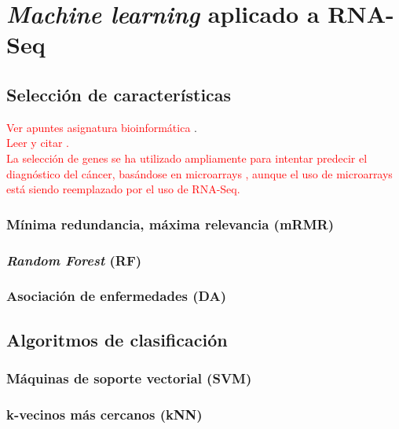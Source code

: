 \chapter{\textit{Machine learning} aplicado a RNA-Seq}

\section{Selección de características}

\textcolor{red}{Ver apuntes asignatura bioinformática} \cite{HerreraMaldonado2020}.\\

\textcolor{red}{Leer y citar \cite{Xing}.}\\

\textcolor{red}{La selección de genes se ha utilizado ampliamente para intentar predecir el diagnóstico del cáncer, basándose en microarrays \cite{Lee2008, Maglietta2007}, aunque el uso de microarrays está siendo reemplazado por el uso de RNA-Seq.}\\

\subsection{Mínima redundancia, máxima relevancia (mRMR)}

\subsection{\textit{Random Forest} (RF)}

\subsection{Asociación de enfermedades (DA)}

\section{Algoritmos de clasificación}

\subsection{Máquinas de soporte vectorial (SVM)}

\subsection{k-vecinos más cercanos (kNN)}


